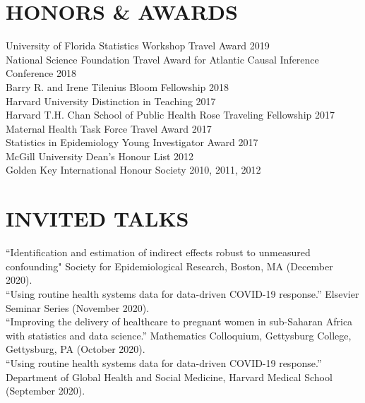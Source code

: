 \documentclass[12pt]{article}
\begin{document}
\section*{\textbf{{\large H}{ONORS} {\large \&} {\large A}{WARDS}}}
University of Florida Statistics Workshop Travel Award \hfill \hfill 2019 \\
National Science Foundation Travel Award for Atlantic Causal Inference Conference \hfill \hfill	2018 \\
Barry R. and Irene Tilenius Bloom Fellowship \hfill \hfill	2018 \\
Harvard University Distinction in Teaching \hfill \hfill 2017 \\
Harvard T.H. Chan School of Public Health Rose Traveling Fellowship \hfill \hfill	2017 \\
Maternal Health Task Force Travel Award \hfill \hfill	2017 \\
Statistics in Epidemiology Young Investigator Award  \hfill \hfill	2017 \\
McGill University Dean's Honour List  \hfill \hfill	2012 \\
Golden Key International Honour Society  \hfill \hfill2010, 2011, 2012 


\section*{\textbf{{\large I}{NVITED} {\large T}{ALKS}}}   

``Identification and estimation of indirect effects robust to unmeasured confounding" Society for Epidemiological Research, Boston, MA (December 2020). \\

``Using routine health systems data for data-driven COVID-19 response.'' Elsevier Seminar Series (November 2020). \\

``Improving the delivery of healthcare to pregnant women in sub-Saharan Africa with statistics and data science.'' Mathematics Colloquium, Gettysburg College, Gettysburg, PA (October 2020). \\ 

``Using routine health systems data for data-driven COVID-19 response.'' Department of Global Health and Social Medicine, Harvard Medical School (September 2020). \\
\end{document}
